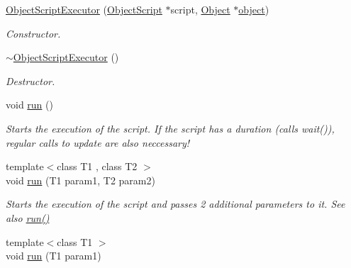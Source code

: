\begin{DoxyCompactItemize}
\item 
\hypertarget{classObjectScriptExecutor_a2f16923bb5998d30ee05dab19292c1f0}{
\hyperlink{classObjectScriptExecutor_a2f16923bb5998d30ee05dab19292c1f0}{\-Object\-Script\-Executor} (\hyperlink{classObjectScript}{\-Object\-Script} $\ast$script, \hyperlink{classObject}{\-Object} $\ast$\hyperlink{classObjectScriptExecutor_a2ec38fb28f01a38be9e9d76205c0715e}{object})}
\label{de/d7c/classObjectScriptExecutor_a2f16923bb5998d30ee05dab19292c1f0}

\begin{DoxyCompactList}\small\item\em \-Constructor. \end{DoxyCompactList}\item 
\hypertarget{classObjectScriptExecutor_a0067b1b8bb72dd9c73c6b0bc0f43df61}{
\hyperlink{classObjectScriptExecutor_a0067b1b8bb72dd9c73c6b0bc0f43df61}{$\sim$\-Object\-Script\-Executor} ()}
\label{de/d7c/classObjectScriptExecutor_a0067b1b8bb72dd9c73c6b0bc0f43df61}

\begin{DoxyCompactList}\small\item\em \-Destructor. \end{DoxyCompactList}\item 
\hypertarget{classObjectScriptExecutor_a328e3f4fe88be8a101f08a769beb88e4}{
void \hyperlink{classObjectScriptExecutor_a328e3f4fe88be8a101f08a769beb88e4}{run} ()}
\label{de/d7c/classObjectScriptExecutor_a328e3f4fe88be8a101f08a769beb88e4}

\begin{DoxyCompactList}\small\item\em \-Starts the execution of the script. \-If the script has a duration (calls wait()), regular calls to update are also neccessary! \end{DoxyCompactList}\item 
\hypertarget{classObjectScriptExecutor_a9f97c50f7f23a8732bca7f6830a0d3de}{
{\footnotesize template$<$class T1 , class T2 $>$ }\\void \hyperlink{classObjectScriptExecutor_a9f97c50f7f23a8732bca7f6830a0d3de}{run} (\-T1 param1, \-T2 param2)}
\label{de/d7c/classObjectScriptExecutor_a9f97c50f7f23a8732bca7f6830a0d3de}

\begin{DoxyCompactList}\small\item\em \-Starts the execution of the script and passes 2 additional parameters to it. \-See also \hyperlink{classObjectScriptExecutor_a328e3f4fe88be8a101f08a769beb88e4}{run()} \end{DoxyCompactList}\item 
\hypertarget{classObjectScriptExecutor_abd7c0595c73d6f28a800039fa95599bd}{
{\footnotesize template$<$class T1 $>$ }\\void \hyperlink{classObjectScriptExecutor_abd7c0595c73d6f28a800039fa95599bd}{run} (\-T1 param1)}
\label{de/d7c/classObjectScriptExecutor_abd7c0595c73d6f28a800039fa95599bd}


\end{DoxyCompactItemize}
